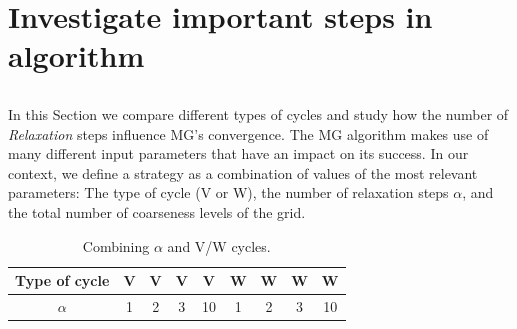 \section{Investigate important steps in algorithm}
\label{sec:pruning}

\subsection{}

In this Section we compare different types of cycles and study how the number
of \textit{Relaxation} steps influence MG's convergence.  The MG algorithm
makes use of many different input parameters that have an impact on its
success.  In our context, we define a strategy as a combination of values of
the most relevant parameters: The type of cycle (V or W), the number of
relaxation steps $\alpha$, and the total number of coarseness levels of the
grid.








\begin{table}[hbt]
 \begin{center}
  \begin{tabular}{|c|c|c|c|c|c|c|c|c|}
   \hline
   Type of cycle & V & V & V & V & W & W & W & W \\
   \hline
   $\alpha$ & 1 & 2 & 3 & 10 & 1 & 2 & 3 & 10 \\
   \hline
  \end{tabular}
 \end{center}
 \caption{Combining $\alpha$ and V/W cycles.}
 \label{table.strat1}
\end{table}

